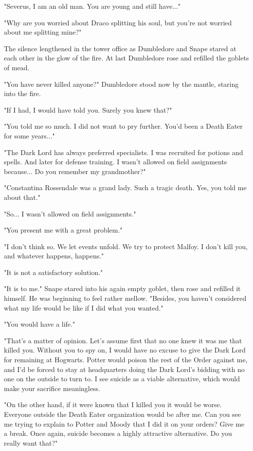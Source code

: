 \documentclass[a4paper,11pt]{article}
\begin{document}
"Severus, I am an old man. You are young and still have..."

"Why are you worried about Draco splitting his soul, but you're not worried about me splitting mine?"

The silence lengthened in the tower office as Dumbledore and Snape stared at each other in the glow of the fire. At last Dumbledore rose and refilled the goblets of mead.

"You have never killed anyone?" Dumbledore stood now by the mantle, staring into the fire.

"If I had, I would have told you. Surely you knew that?"

"You told me so much. I did not want to pry further. You'd been a Death Eater for some years..."

"The Dark Lord has always preferred specialists. I was recruited for potions and spells. And later for defense training. I wasn't allowed on field assignments because... Do you remember my grandmother?"

"Constantina Rossendale was a grand lady. Such a tragic death. Yes, you told me about that."

"So... I wasn't allowed on field assignments."

"You present me with a great problem."

"I don't think so. We let events unfold. We try to protect Malfoy. I don't kill you, and whatever happens, happens."

"It is not a satisfactory solution."

"It is to me." Snape stared into his again empty goblet, then rose and refilled it himself. He was beginning to feel rather mellow. "Besides, you haven't considered what my life would be like if I did what you wanted."

"You would have a life."

"That's a matter of opinion. Let's assume first that no one knew it was me that killed you. Without you to spy on, I would have no excuse to give the Dark Lord for remaining at Hogwarts. Potter would poison the rest of the Order against me, and I'd be forced to stay at headquarters doing the Dark Lord's bidding with no one on the outside to turn to. I see suicide as a viable alternative, which would make your sacrifice meaningless.

"On the other hand, if it were known that I killed you it would be worse. Everyone outside the Death Eater organization would be after me. Can you see me trying to explain to Potter and Moody that I did it on your orders? Give me a break. Once again, suicide becomes a highly attractive alternative. Do you really want that?"
\end{document}
